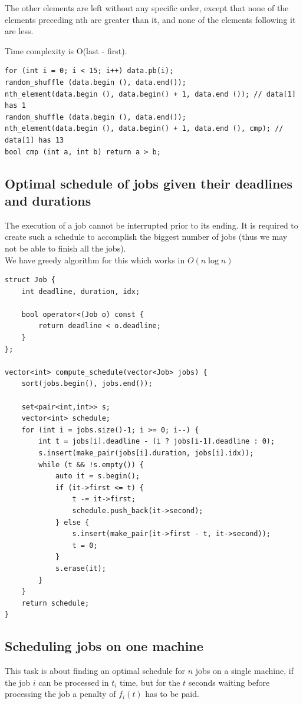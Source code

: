 \documentclass[8pt, a4paper, oneside, twocolumn]{extarticle}
\begin{document}
The other elements are left without any specific order, except that none of the elements preceding nth are greater than it, and none of the elements following it are less.

Time complexity is O(last - first).
\begin{verbatim}
for (int i = 0; i < 15; i++) data.pb(i);
random_shuffle (data.begin (), data.end());
nth_element(data.begin (), data.begin() + 1, data.end ()); // data[1] has 1
random_shuffle (data.begin (), data.end());
nth_element(data.begin (), data.begin() + 1, data.end (), cmp); // data[1] has 13
bool cmp (int a, int b) return a > b;
\end{verbatim}
\subsection{Optimal schedule of jobs given their deadlines and durations}
The execution of a job cannot be interrupted prior to its ending. It is required to create such a schedule to accomplish the biggest number of jobs (thus we may not be able to finish all the jobs).\\We have greedy algorithm for this which works in $O(n \log n)$
\begin{verbatim}
struct Job {
    int deadline, duration, idx;

    bool operator<(Job o) const {
        return deadline < o.deadline;
    }
};

vector<int> compute_schedule(vector<Job> jobs) {
    sort(jobs.begin(), jobs.end());

    set<pair<int,int>> s;
    vector<int> schedule;
    for (int i = jobs.size()-1; i >= 0; i--) {
        int t = jobs[i].deadline - (i ? jobs[i-1].deadline : 0);
        s.insert(make_pair(jobs[i].duration, jobs[i].idx));
        while (t && !s.empty()) {
            auto it = s.begin();
            if (it->first <= t) {
                t -= it->first;
                schedule.push_back(it->second);
            } else {
                s.insert(make_pair(it->first - t, it->second));
                t = 0;
            }
            s.erase(it);
        }
    }
    return schedule;
}
\end{verbatim}
\subsection{Scheduling jobs on one machine}

This task is about finding an optimal schedule for $n$ jobs on a single machine, if the job $i$ can be processed in $t_i$ time, but for the $t$ seconds waiting before processing the job a penalty of $f_i(t)$ has to be paid.
\end{document}
